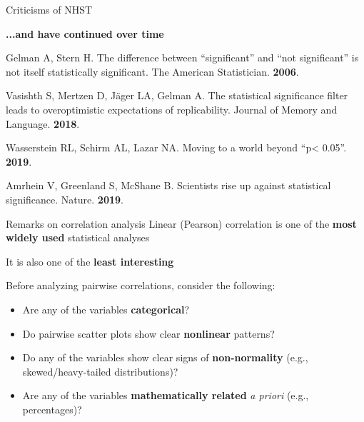 \documentclass[12pt,aspectratio=169]{beamer}
\begin{document}
\begin{frame}{Criticisms of NHST}

\textbf{...and have continued over time}

Gelman A, Stern H. The difference between “significant” and “not significant” is not itself statistically significant. The American Statistician. \textbf{2006}.


Vasishth S, Mertzen D, Jäger LA, Gelman A. The statistical significance filter leads to overoptimistic expectations of replicability. Journal of Memory and Language. \textbf{2018}.

Wasserstein RL, Schirm AL, Lazar NA. Moving to a world beyond “p< 0.05”. \textbf{2019}.

Amrhein V, Greenland S, McShane B. Scientists rise up against statistical significance. Nature. \textbf{2019}.

\end{frame}

\begin{frame}{Remarks on correlation analysis}
    Linear (Pearson) correlation is one of the \textbf{most widely used} statistical analyses
    \pause

    It is also one of the \textbf{least interesting}
    \pause

    Before analyzing pairwise correlations, consider the following:
    \begin{itemize}[<+->]
        \item Are any of the variables \textbf{categorical}?
        \item Do pairwise scatter plots show clear \textbf{nonlinear} patterns?
        \item Do any of the variables show clear signs of \textbf{non-normality} (e.g., skewed/heavy-tailed distributions)?
        \item Are any of the variables \textbf{mathematically related} \textit{a priori} (e.g., percentages)?
    \end{itemize}
\end{frame}

\end{document}
